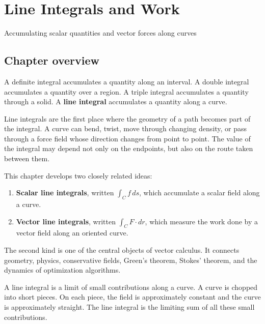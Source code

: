 \documentclass[11pt,oneside]{book}
\begin{document}
\setcounter{chapter}{19}
\chapter{Line Integrals and Work}
\vspace{-1.5em}
{\large\color{darkgray}Accumulating scalar quantities and vector forces along curves}

\section*{Chapter overview}

A definite integral accumulates a quantity along an interval. A double integral accumulates a quantity over a region. A triple integral accumulates a quantity through a solid. A \textbf{line integral} accumulates a quantity along a curve.

Line integrals are the first place where the geometry of a path becomes part of the integral. A curve can bend, twist, move through changing density, or pass through a force field whose direction changes from point to point. The value of the integral may depend not only on the endpoints, but also on the route taken between them.

This chapter develops two closely related ideas:
\begin{enumerate}
  \item \textbf{Scalar line integrals}, written $\int_C f\,ds$, which accumulate a scalar field along a curve.
  \item \textbf{Vector line integrals}, written $\int_C F\cdot dr$, which measure the work done by a vector field along an oriented curve.
\end{enumerate}
The second kind is one of the central objects of vector calculus. It connects geometry, physics, conservative fields, Green's theorem, Stokes' theorem, and the dynamics of optimization algorithms.

\begin{mainideabox}
A line integral is a limit of small contributions along a curve. A curve is chopped into short pieces. On each piece, the field is approximately constant and the curve is approximately straight. The line integral is the limiting sum of all these small contributions.
\end{mainideabox}
\end{document}
